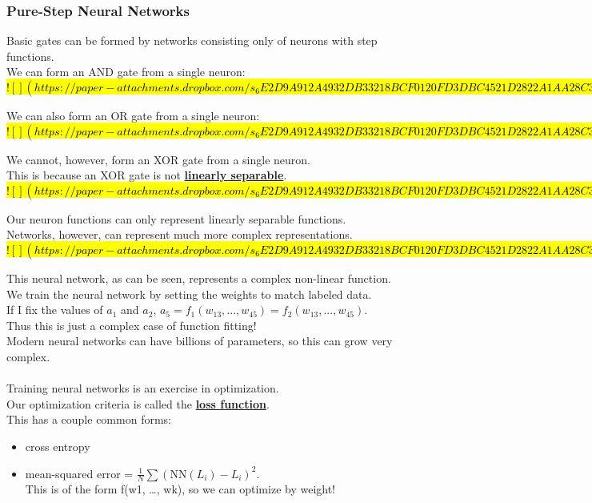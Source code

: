 \documentclass[../../lecture_notes.tex]{subfiles}
\begin{document}
\subsubsection*{Pure-Step Neural Networks}
\noindent Basic gates can be formed by networks consisting only of neurons with step functions.\\

We can form an AND gate from a single neuron:
\hl{
$![](https://paper-attachments.dropbox.com/s_6E2D9A912A4932DB33218BCF0120FD3DBC4521D2822A1AA28C3A628B5392148D_1591132995454_Untitled+drawing+4.jpg)$
}

\noindent We can also form an OR gate from a single neuron:
\hl{
$![](https://paper-attachments.dropbox.com/s_6E2D9A912A4932DB33218BCF0120FD3DBC4521D2822A1AA28C3A628B5392148D_1591133040302_Untitled+drawing+5.jpg)$
}

We cannot, however, form an XOR gate from a single neuron.\\
This is because an XOR gate is not \textbf{\underline{linearly separable}}.
\hl{
$![](https://paper-attachments.dropbox.com/s_6E2D9A912A4932DB33218BCF0120FD3DBC4521D2822A1AA28C3A628B5392148D_1591133370907_Untitled+drawing+6.jpg)$
}

\noindent Our neuron functions can only represent linearly separable functions.\\
Networks, however, can represent much more complex representations.\\

\hl{
$![](https://paper-attachments.dropbox.com/s_6E2D9A912A4932DB33218BCF0120FD3DBC4521D2822A1AA28C3A628B5392148D_1591133796275_Untitled+drawing+7.jpg)$
}

\noindent This neural network, as can be seen, represents a complex non-linear function.\\
We train the neural network by setting the weights to match labeled data.\\
If I fix the values of $a_1$ and $a_2$, $a_5 = f_1(w_{13}, ..., w_{45}) = f_2(w_{13}, ..., w_{45})$.\\
Thus this is just a complex case of function fitting!\\
Modern neural networks can have billions of parameters, so this can grow very complex.\\
\\
Training neural networks is an exercise in optimization.\\
Our optimization criteria is called the \textbf{\underline{loss function}}.\\
This has a couple common forms:
\begin{itemize} [itemsep=0mm]
	\item cross entropy
	\item mean-squared error = $\frac {1}{N} \sum (\text{NN}(L_i) - L_i)^2$.\\
		This is of the form f(w1, …, wk), so we can optimize by weight!
\end{itemize} \medskip
\end{document}
